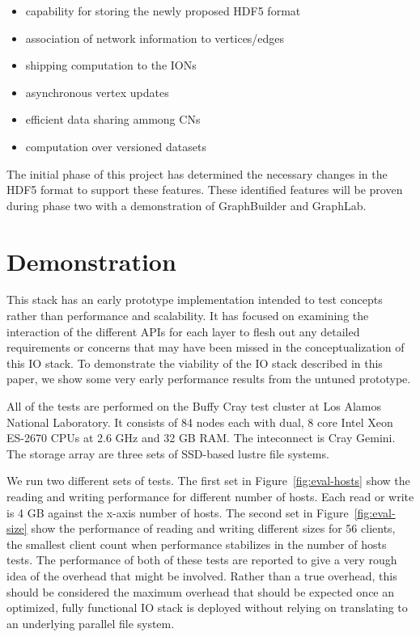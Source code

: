 \documentclass[conference]{IEEEtran}
\begin{document}
\begin{itemize}
\itemsep1pt\parskip0pt
\item
  capability for storing the newly proposed HDF5 format
\item
  association of network information to vertices/edges
\item
  shipping computation to the IONs
\item
  asynchronous vertex updates
\item
  efficient data sharing ammong CNs
\item
  computation over versioned datasets
\end{itemize}

The initial phase of this project has determined the necessary changes in the
HDF5 format to support these features. These identified features will be
proven during phase two with a demonstration of GraphBuilder and GraphLab.

\section{Demonstration}
\label{sec:evaluation}

This stack has an early prototype implementation intended to test concepts
rather than performance and scalability. It has focused on examining the
interaction of the different APIs for each layer to flesh out any detailed
requirements or concerns that may have been missed in the conceptualization of
this IO stack. To demonstrate the viability of the IO stack described in this
paper, we show some very early performance results from the untuned prototype.

All of the tests are performed on the Buffy Cray test cluster at Los Alamos
National Laboratory. It consists of 84 nodes each with dual, 8 core Intel
Xeon ES-2670 CPUs at 2.6 GHz and 32 GB RAM. The inteconnect is Cray Gemini.
The storage array are three sets of SSD-based lustre file systems.

We run two different sets of tests. The first set in
Figure~\ref{fig:eval-hosts} show the reading and writing performance for
different number of hosts. Each read or write is 4 GB against the x-axis number
of hosts. The second set in Figure~\ref{fig:eval-size} show the performance of
reading and writing different sizes for 56 clients, the smallest client count
when performance stabilizes in the number of hosts tests.  The performance of
both of these tests are reported to give a very rough idea of the overhead that
might be involved. Rather than a true overhead, this should be considered the
maximum overhead that should be expected once an optimized, fully functional IO
stack is deployed without relying on translating to an underlying parallel file
system. 
\end{document}
